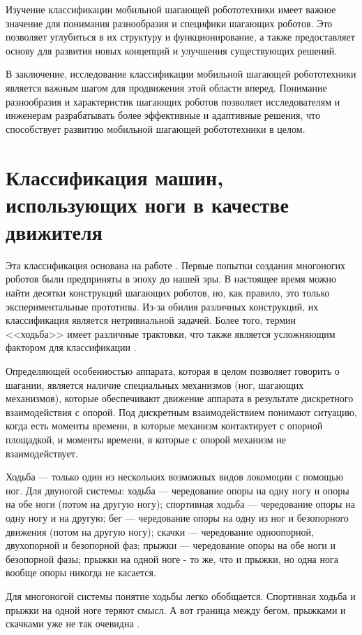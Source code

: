 Изучение классификации мобильной шагающей робототехники имеет важное значение для понимания разнообразия и специфики шагающих роботов. Это позволяет углубиться в их структуру и функционирование, а также предоставляет основу для развития новых концепций и улучшения существующих решений.

В заключение, исследование классификации мобильной шагающей робототехники является важным шагом для продвижения этой области вперед. Понимание разнообразия и характеристик шагающих роботов позволяет исследователям и инженерам разрабатывать более эффективные и адаптивные решения, что способствует развитию мобильной шагающей робототехники в целом.


\section{Классификация машин, использующих ноги в качестве движителя}
Эта классификация основана на работе \cite{Maloletov2015dinamica}. Первые попытки создания многоногих роботов были предприняты в эпоху до нашей эры. В настоящее время можно найти десятки конструкций шагающих роботов, но, как правило, это только экспериментальные прототипы. Из-за обилия различных конструкций, их классификация является нетривиальной задачей. Более того, термин <<ходьба>> имеет различные трактовки, что также является усложняющим фактором для классификации \cite{Bel1984,Brisk2009,Ohom1984,Pavl2013}. 

Определяющей особенностью аппарата, которая в целом позволяет говорить о шагании, является наличие специальных механизмов (ног, шагающих механизмов), которые обеспечивают движение аппарата в результате дискретного взаимодействия с опорой. Под дискретным взаимодействием понимают ситуацию, когда есть моменты времени, в которые механизм контактирует с опорной площадкой, и моменты времени, в которые с опорой механизм не взаимодействует.

Ходьба --- только один из нескольких возможных видов локомоции с помощью ног. Для двуногой системы: ходьба --- чередование опоры на одну ногу и опоры на обе ноги (потом на другую ногу); спортивная ходьба --- чередование опоры на одну ногу и на другую; бег --- чередование опоры на одну из ног и безопорного движения (потом на другую ногу); скачки --- чередование одноопорной, двухопорной и безопорной фаз; прыжки --- чередование опоры на обе ноги и безопорной фазы; прыжки на одной ноге - то же, что и прыжки, но одна нога вообще опоры никогда не касается.

Для многоногой системы понятие ходьбы легко обобщается. Спортивная ходьба и прыжки на одной ноге теряют смысл. А вот граница между бегом, прыжками и скачками уже не так очевидна \cite{Bel1984}. 

